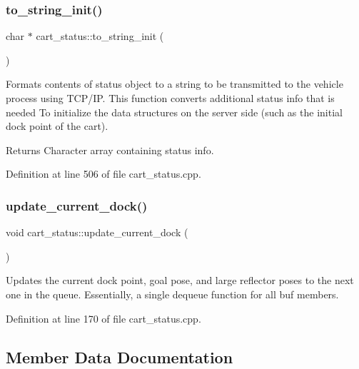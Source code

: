 \mbox{\label{classcart__status_ae7c18dab45a356066eb36b81b985194f}} 
\subsubsection{\texorpdfstring{to\+\_\+string\+\_\+init()}{to\_string\_init()}}
{\footnotesize\ttfamily char $\ast$ cart\+\_\+status\+::to\+\_\+string\+\_\+init (\begin{DoxyParamCaption}{ }\end{DoxyParamCaption})}

Formats contents of status object to a string to be transmitted to the vehicle process using T\+C\+P/\+IP. This function converts additional status info that is needed To initialize the data structures on the server side (such as the initial dock point of the cart). \begin{DoxyReturn}{Returns}
Character array containing status info. 
\end{DoxyReturn}


Definition at line 506 of file cart\+\_\+status.\+cpp.

\mbox{\label{classcart__status_a25c8b8f4c2d8b516284f9cb463f007a8}} 
\subsubsection{\texorpdfstring{update\+\_\+current\+\_\+dock()}{update\_current\_dock()}}
{\footnotesize\ttfamily void cart\+\_\+status\+::update\+\_\+current\+\_\+dock (\begin{DoxyParamCaption}{ }\end{DoxyParamCaption})}

Updates the current dock point, goal pose, and large reflector poses to the next one in the queue. Essentially, a single dequeue function for all buf members. 

Definition at line 170 of file cart\+\_\+status.\+cpp.



\subsection{Member Data Documentation}
\mbox{\label{classcart__status_abee50a181916299e573abd0507fcba47}} 
